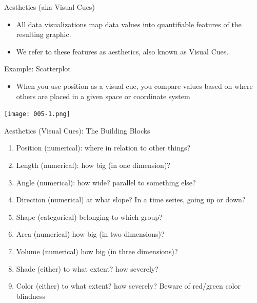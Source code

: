 \documentclass[10pt]{beamer}\usepackage[]{graphicx}\usepackage[]{color}
\begin{document}
	
	\begin{frame}{Aesthetics (aka Visual Cues)}
	\begin{itemize}
		\item All data visualizations map data values into quantifiable features of the resulting graphic. 
		\item We refer to these features as aesthetics, also known as Visual Cues.
	\end{itemize}
		\end{frame}
	
	
	\begin{frame}{Example: Scatterplot}
		\begin{itemize}
			\item When you use position as a visual cue, you compare values based on where others are placed in a given space or coordinate system
		\end{itemize}
		
\texttt{[image: 005-1.png]}
	\end{frame}

\begin{frame}{Aesthetics (Visual Cues): The Building Blocks}
	\begin{enumerate}
		\item Position (numerical): where in relation to other things? 
		\item Length (numerical): how big (in one dimension)? 
		\item  Angle (numerical): how wide? parallel to something else? 
		\item  Direction (numerical) at what slope? In a time series, going up or down? 
		\item  Shape (categorical) belonging to which group? 
		\item  Area (numerical) how big (in two dimensions)? 
		\item  Volume (numerical) how big (in three dimensions)? 
		\item  Shade (either) to what extent? how severely? 
		\item  Color (either) to what extent? how severely? Beware of red/green color blindness
		
		
	\end{enumerate}
\end{frame}
\end{document}
